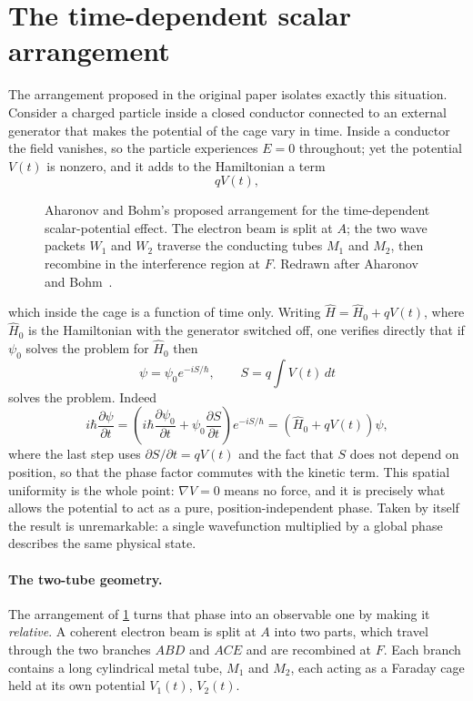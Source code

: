 \section{The time-dependent scalar arrangement}

The arrangement proposed in the original paper isolates exactly this
situation. Consider a charged particle inside a closed conductor
connected to an external generator that makes the potential of the cage
vary in time. Inside a conductor the field vanishes, so the particle
experiences \(E = 0\) throughout; yet the potential \(V(t)\) is
nonzero, and it adds to the Hamiltonian a term
\[
	qV(t),
\]
\begin{figure}[H]
	\centering
	\resizebox{0.72\textwidth}{!}{%
	}
	\caption{Aharonov and Bohm's proposed arrangement for the time-dependent
		scalar-potential effect. The electron beam is split at $A$; the two wave
		packets $W_1$ and $W_2$ traverse the conducting tubes $M_1$ and
		$M_2$, then recombine in the interference region at $F$. Redrawn after
		Aharonov and Bohm~\cite[Fig.~1]{aharonovSignificanceElectromagneticPotentials1959}.}
	\label{fig:aharonov-bohm-setup}
\end{figure}

which inside the cage is a function of time only. Writing \(\hat H
= \hat H_0 + qV(t)\), where \(\hat H_0\) is the Hamiltonian with the
generator switched off, one verifies directly that if \(\psi_0\) solves
the problem for \(\hat H_0\) then
\[
	\psi = \psi_0 e^{-i S/\hbar}, \qquad S = q\int V(t) \, dt
\]
solves the problem. Indeed
\[
	i \hbar \frac{\partial \psi}{\partial t} = \left(
	i\hbar \frac{\partial \psi_0}{\partial t} + \psi_0
	\frac{\partial S}{\partial t}
	\right) e^{-i S/\hbar} = (\hat H_0 + qV(t)) \psi,
\]
where the last step uses \(\partial S / \partial t = qV(t)\) and the
fact that \(S\) does not depend on position, so that the phase factor
commutes with the kinetic term. This spatial uniformity is the whole
point: \(\nabla V = 0\) means no force, and it is precisely what allows
the potential to act as a pure, position-independent phase. Taken by itself
the result is unremarkable: a single wavefunction multiplied by a global
phase describes the same physical state.


\paragraph{The two-tube geometry.}
The arrangement of \cref{fig:aharonov-bohm-setup} turns that phase into an observable
one by making it \emph{relative}. A coherent electron beam is split at $A$ into
two parts, which travel through the two branches $ABD$ and $ACE$ and are
recombined at $F$. Each branch contains a long cylindrical metal tube, $M_1$ and
$M_2$, each acting as a Faraday cage held at its own potential $V_1(t)$,
$V_2(t)$.

